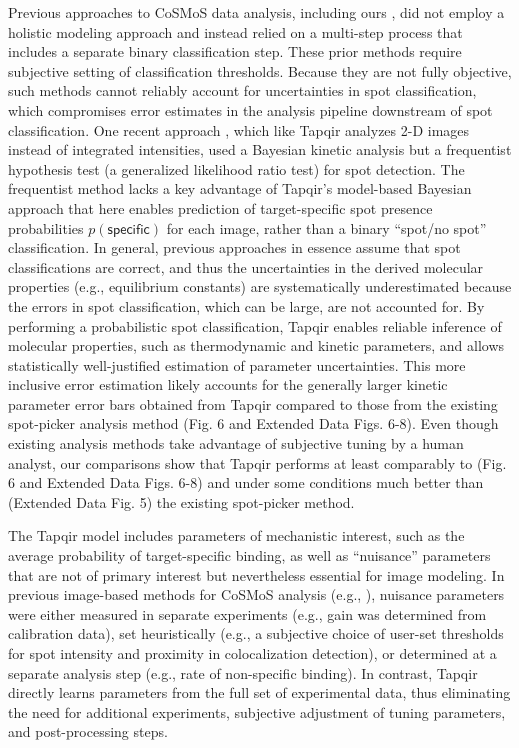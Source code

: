 Previous approaches to CoSMoS data analysis, including ours \cite{Friedman2015-nx}, did not employ a holistic modeling approach and instead relied on a multi-step process that includes a separate binary classification step.  These prior methods require subjective setting of classification thresholds.  Because they are not fully objective, such methods cannot reliably account for uncertainties in spot classification, which compromises error estimates in the analysis pipeline downstream of spot classification. One recent approach \cite{Smith2019-yb,Smith2015-gf}, which like Tapqir analyzes 2-D images instead of integrated intensities, used a Bayesian kinetic analysis but a frequentist hypothesis test (a generalized likelihood ratio test) for spot detection.  The frequentist method lacks a key advantage of Tapqir's model-based Bayesian approach that here enables prediction of target-specific spot presence probabilities $p(\mathsf{specific})$ for each image, rather than a binary ``spot/no spot'' classification.  In general, previous approaches in essence assume that spot classifications are correct, and thus the uncertainties in the derived molecular properties (e.g., equilibrium constants) are systematically underestimated because the errors in spot classification, which can be large, are not accounted for. By performing a probabilistic spot classification, Tapqir enables reliable inference of molecular properties, such as thermodynamic and kinetic parameters, and allows statistically  well-justified estimation of parameter uncertainties.  This more inclusive error estimation likely accounts for the generally larger kinetic parameter error bars obtained from Tapqir compared to those from the existing spot-picker analysis method (Fig. 6 and Extended Data Figs. 6-8). Even though existing analysis methods take advantage of subjective tuning by a human analyst, our comparisons show that Tapqir performs at least comparably to (Fig. 6 and Extended Data Figs. 6-8) and under some conditions much better than (Extended Data Fig. 5) the existing spot-picker method.

The Tapqir model includes parameters of mechanistic interest, such as the average probability of target-specific binding, as well as ``nuisance'' parameters that are not of primary interest but nevertheless essential for image modeling. In previous image-based methods for CoSMoS analysis (e.g., \cite{Friedman2015-nx,Smith2019-yb}), nuisance parameters were either measured in separate experiments (e.g., gain was determined from calibration data), set heuristically (e.g., a subjective choice of user-set thresholds for spot intensity and proximity in colocalization detection), or determined at a separate analysis step (e.g., rate of non-specific binding). In contrast, Tapqir directly learns parameters from the full set of experimental data, thus eliminating the need for additional experiments, subjective adjustment of tuning parameters, and post-processing steps.

